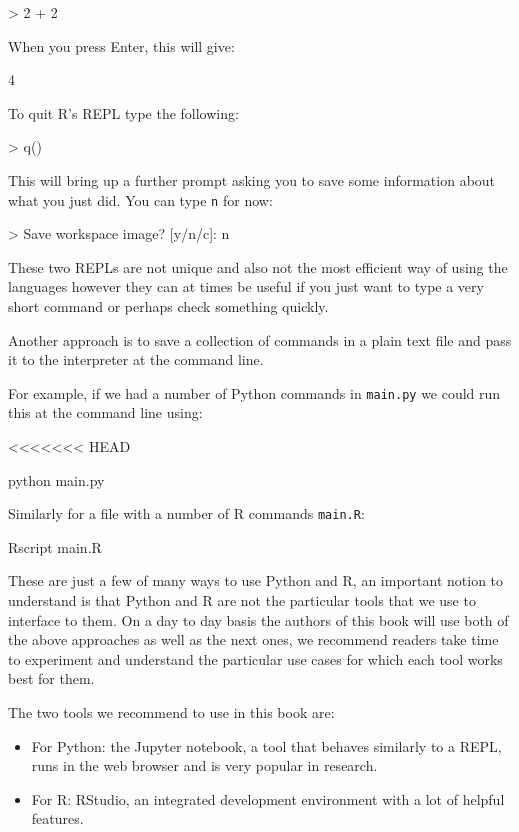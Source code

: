 \begin{Rin}
> 2 + 2
\end{Rin}

When you press Enter, this will give:

\begin{Rout}
4
\end{Rout}

To quit R's REPL type the following:

\begin{Rin}
> q()
\end{Rin}

This will bring up a further prompt asking you to save some information about
what you just did. You can type \texttt{n} for now:

\begin{Rin}
> Save workspace image? [y/n/c]: n
\end{Rin}

These two REPLs are not unique and also not the most efficient way of using the
languages however they can at times be useful if you just want to type a very
short command or perhaps check something quickly.

Another approach is to save a collection of commands in a plain text file and
pass it to the interpreter at the command line.

For example, if we had a number of Python commands in \texttt{main.py}
we could run this at the command line using:

<<<<<<< HEAD
\begin{cliin}
python main.py
\end{cliin}

Similarly for a file with a number of R commands \texttt{main.R}:

\begin{cliin}
Rscript main.R
\end{cliin}

These are just a few of many ways to use Python and R, an important notion to
understand is that Python and R are not the particular tools that we use to
interface to them. On a day to day basis the authors of this book will use both
of the above approaches as well as the next ones, we recommend readers take time
to experiment and understand the particular use cases for which each tool works
best for them.

The two tools we recommend to use in this book are:

\begin{itemize}
    \item For Python: the Jupyter notebook, a tool that behaves similarly to a
        REPL, runs in the web browser and is very popular in research.
    \item For R: RStudio, an integrated development environment with a lot of
        helpful features.
\end{itemize}

